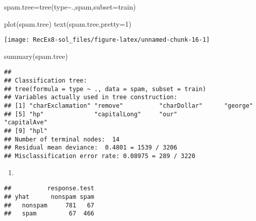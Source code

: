 \documentclass[
]{article}
\newenvironment{Shaded}{\begin{snugshade}}{\end{snugshade}}
\newcommand{\AttributeTok}[1]{\textcolor[rgb]{0.77,0.63,0.00}{#1}}
\newcommand{\DecValTok}[1]{\textcolor[rgb]{0.00,0.00,0.81}{#1}}
\newcommand{\FunctionTok}[1]{\textcolor[rgb]{0.00,0.00,0.00}{#1}}
\newcommand{\NormalTok}[1]{#1}
\newcommand{\OtherTok}[1]{\textcolor[rgb]{0.56,0.35,0.01}{#1}}
\newcommand{\SpecialCharTok}[1]{\textcolor[rgb]{0.00,0.00,0.00}{#1}}
\newcommand{\StringTok}[1]{\textcolor[rgb]{0.31,0.60,0.02}{#1}}
\providecommand{\tightlist}{%
  \setlength{\itemsep}{0pt}\setlength{\parskip}{0pt}}
\begin{document}
\begin{Shaded}
\begin{Highlighting}[]
\NormalTok{spam.tree}\OtherTok{=}\FunctionTok{tree}\NormalTok{(type}\SpecialCharTok{\textasciitilde{}}\NormalTok{.,spam,}\AttributeTok{subset=}\NormalTok{train)}

\FunctionTok{plot}\NormalTok{(spam.tree)}
\FunctionTok{text}\NormalTok{(spam.tree,}\AttributeTok{pretty=}\DecValTok{1}\NormalTok{)}
\end{Highlighting}
\end{Shaded}

\texttt{[image: RecEx8-sol\_files/figure-latex/unnamed-chunk-16-1]}

\begin{Shaded}
\begin{Highlighting}[]
\FunctionTok{summary}\NormalTok{(spam.tree)}
\end{Highlighting}
\end{Shaded}

\begin{verbatim}
## 
## Classification tree:
## tree(formula = type ~ ., data = spam, subset = train)
## Variables actually used in tree construction:
## [1] "charExclamation" "remove"          "charDollar"      "george"         
## [5] "hp"              "capitalLong"     "our"             "capitalAve"     
## [9] "hpl"            
## Number of terminal nodes:  14 
## Residual mean deviance:  0.4801 = 1539 / 3206 
## Misclassification error rate: 0.08975 = 289 / 3220
\end{verbatim}

\begin{enumerate}
\def\labelenumi{\alph{enumi})}
\setcounter{enumi}{3}
\tightlist
\item
\end{enumerate}

\begin{Shaded}
\end{Shaded}

\begin{verbatim}
##          response.test
## yhat      nonspam spam
##   nonspam     781   67
##   spam         67  466
\end{verbatim}
\end{document}
